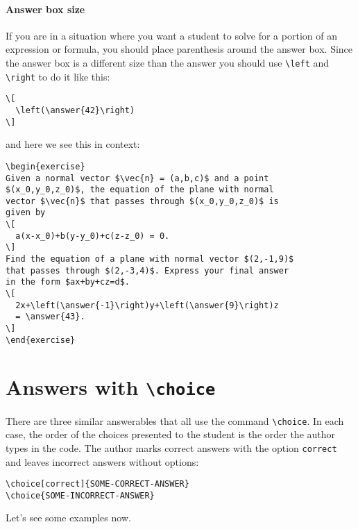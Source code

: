 \documentclass{ximera}
\begin{document}
\paragraph{Answer box size}
If you are in a situation where you want a student to solve for a portion
of an expression or formula, you should place parenthesis around the answer
box. Since the answer box is a different size than the answer you should use
\verb!\left! and \verb!\right! to do it like
this:
\begin{verbatim}
\[
  \left(\answer{42}\right)
\]
\end{verbatim}
and here we see this in context:
\begin{verbatim}
\begin{exercise}
Given a normal vector $\vec{n} = (a,b,c)$ and a point
$(x_0,y_0,z_0)$, the equation of the plane with normal
vector $\vec{n}$ that passes through $(x_0,y_0,z_0)$ is
given by
\[
  a(x-x_0)+b(y-y_0)+c(z-z_0) = 0.
\]
Find the equation of a plane with normal vector $(2,-1,9)$
that passes through $(2,-3,4)$. Express your final answer
in the form $ax+by+cz=d$.
\[
  2x+\left(\answer{-1}\right)y+\left(\answer{9}\right)z
  = \answer{43}.
\]
\end{exercise}
\end{verbatim}

\section{Answers with \texttt{\textbackslash choice}}

There are three similar answerables that all use the command \verb!\choice!. In
each case, the order of the choices presented to the student is the order the
author types in the code. The author marks correct answers with the option
\verb!correct! and leaves incorrect answers without options:
\begin{verbatim}
\choice[correct]{SOME-CORRECT-ANSWER}
\choice{SOME-INCORRECT-ANSWER}
\end{verbatim}
Let's see some examples now.
\end{document}
